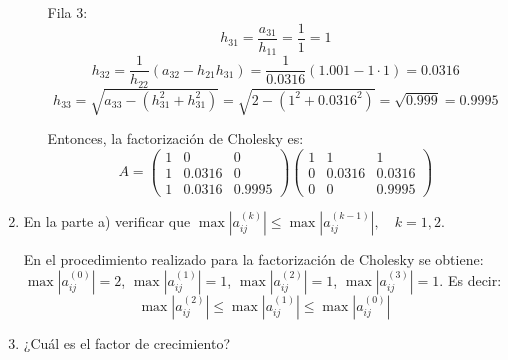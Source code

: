 \begin{enumerate}[]
\begin{enumerate}[]
            Fila 3:
            \begin{equation}
                h_{31} = \frac{a_{31}}{h_{11}} = \frac{1}{1} = 1 
            \end{equation}
            \begin{equation}
                h_{32} = \frac{1}{ h_{22} } \left( a_{32} - h_{21} h_{31} \right) 
                       = \frac{1}{ 0.0316 } \left(  1.001 - 1 \cdot 1 \right) = 0.0316
            \end{equation}
            \begin{equation}
                h_{33} = \sqrt{a_{33} - \left(h_{31}^2 + h_{31}^2\right)} = \sqrt{2 - \left(1^2 + 0.0316^2\right)} = \sqrt{0.999} = 0.9995
            \end{equation}
            
            Entonces, la factorización de Cholesky es:
            \begin{equation}
                A = \begin{pmatrix}
                    1 & 0      & 0      \\ 
                    1 & 0.0316 & 0      \\ 
                    1 & 0.0316 & 0.9995
                \end{pmatrix} \begin{pmatrix}
                    1 & 1      & 1      \\ 
                    0 & 0.0316 & 0.0316 \\ 
                    0 & 0      & 0.9995
                \end{pmatrix}
            \end{equation}
            
        \end{enumerate}
        
    \item En la parte a) verificar que $\max |a^{(k)}_{ij}| \leq \max |a^{(k-1)}_{ij}|, \quad k=1,2$.
    
    En el procedimiento realizado para la factorización de Cholesky se obtiene: $\max |a^{(0)}_{ij}| = 2$, $\max |a^{(1)}_{ij}| = 1$, $\max |a^{(2)}_{ij}| = 1$, $\max |a^{(3)}_{ij}| = 1$. Es decir:
    \begin{equation}
        \max |a^{(2)}_{ij}| \leq \max |a^{(1)}_{ij}| \leq \max |a^{(0)}_{ij}|
    \end{equation}
    
    \item ¿Cuál es el factor de crecimiento?
    

\end{enumerate}
